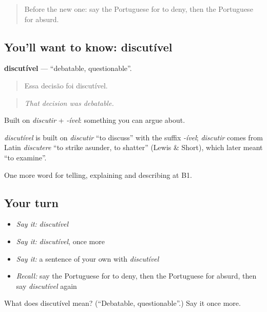 \label{lesson:PT-C340-discutivel}



\begin{quote}
Before the new one: say the Portuguese for to deny, then the Portuguese for absurd.
\end{quote}

\subsection*{You'll want to know: discutível}
\textbf{discutível} — \textquotedblleft{}debatable, questionable\textquotedblright{}.

\begin{quote}
Essa decisão foi discutível.
\end{quote}

\begin{quote}
\emph{That decision was debatable.}
\end{quote}

Built on \emph{discutir} + \emph{-ível}: something you can argue about.

\begin{cousinweb}
\emph{discutível} is built on \emph{discutir} \textquotedblleft{}to discuss\textquotedblright{} with the suffix \emph{-ível}; \emph{discutir} comes from Latin \emph{discutere} \textquotedblleft{}to strike asunder, to shatter\textquotedblright{} (Lewis \& Short), which later meant \textquotedblleft{}to examine\textquotedblright{}.
\end{cousinweb}

\begin{grammarlens}[title={What you've built}]
One more word for telling, explaining and describing at B1.
\end{grammarlens}

\subsection*{Your turn}
\begin{itemize}
\raggedright
  \item \emph{Say it:} \emph{discutível}
  \item \emph{Say it:} \emph{discutível}, once more
  \item \emph{Say it:} a sentence of your own with \emph{discutível}
  \item \emph{Recall:} say the Portuguese for to deny, then the Portuguese for absurd, then say \emph{discutível} again
\end{itemize}

\begin{tcolorbox}[breakable,colback=teal!4,colframe=teal!35!black,title={Before you move on}]
What does discutível mean? (\textquotedblleft{}Debatable, questionable\textquotedblright{}.) Say it once more.
\end{tcolorbox}
